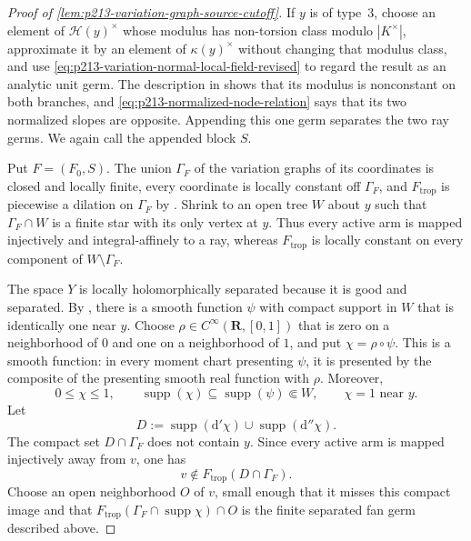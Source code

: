 \begin{proof}[Proof of
\cref{lem:p213-variation-graph-source-cutoff}]
If $y$ is of type~$3$, choose an element of $\mathcal H(y)^\times$ whose
modulus has non-torsion class modulo $|K^\times|$, approximate it by an
element of $\kappa(y)^\times$ without changing that modulus class, and use
\eqref{eq:p213-variation-normal-local-field-revised} to regard the result
as an analytic unit germ.  The description in
\cite[\S4.2.11.2]{Ducros24CurveStructure} shows that its modulus is
nonconstant on both branches, and
\eqref{eq:p213-normalized-node-relation} says that its two normalized
slopes are opposite.  Appending this one germ separates the two ray
germs.  We again call the appended block $S$.

Put $F=(F_0,S)$.  The union $\Gamma_F$ of the variation graphs of its
coordinates is closed and locally finite, every coordinate is locally
constant off $\Gamma_F$, and $F_{\mathrm{trop}}$ is piecewise a dilation
on $\Gamma_F$ by \cite[\S\S4.5.21.1--4.5.21.2]
{Ducros24CurveStructure}.  Shrink to an open tree $W$ about $y$ such that
$\Gamma_F\cap W$ is a finite star with its only vertex at $y$.  Thus every
active arm is mapped injectively and integral-affinely to a ray, whereas
$F_{\mathrm{trop}}$ is locally constant on every component of
$W\setminus\Gamma_F$.

The space $Y$ is locally holomorphically separated because it is good and
separated.  By \cite[Corollary~15.2.5]{CLD25}, there is a smooth function
$\psi$ with compact support in $W$ that is identically one near $y$.
Choose $\rho\in C^\infty(\mathbf R,[0,1])$ that is zero on a neighborhood
of $0$ and one on a neighborhood of $1$, and put $\chi=\rho\circ\psi$.
This is a smooth function: in every moment chart presenting $\psi$, it is
presented by the composite of the presenting smooth real function with
$\rho$.  Moreover,
\[
 0\leq\chi\leq1,\qquad
 \operatorname{supp}(\chi)\subseteq\operatorname{supp}(\psi)\Subset W,
 \qquad \chi=1\text{ near }y.
\]
Let
\[
        D:=\operatorname{supp}(\mathrm d'\chi)
             \cup\operatorname{supp}(\mathrm d''\chi).
\]
The compact set $D\cap\Gamma_F$ does not contain $y$.  Since every active
arm is mapped injectively away from $v$, one has
\[
                v\notin F_{\mathrm{trop}}(D\cap\Gamma_F).
\]
Choose an open neighborhood $O$ of $v$, small enough that it misses this
compact image and that
$F_{\mathrm{trop}}(\Gamma_F\cap\operatorname{supp}\chi)\cap O$ is the
finite separated fan germ described above.


\end{proof}
